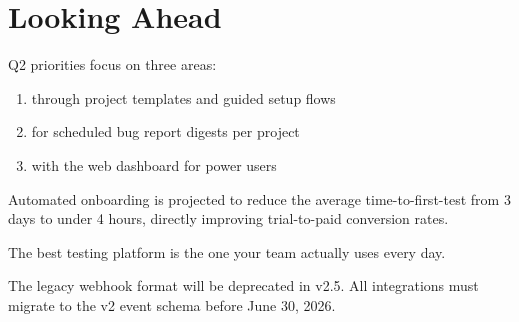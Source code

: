 \documentclass[11pt]{article}
\begin{document}
\section{Looking Ahead}

Q2 priorities focus on three areas:

\begin{enumerate}
    \item {} through project templates and guided setup flows
    \item {} for scheduled bug report digests per project
    \item {} with the web dashboard for power users
\end{enumerate}

\begin{businessvalue}
Automated onboarding is projected to reduce the average time-to-first-test from 3 days to under 4 hours, directly improving trial-to-paid conversion rates.
\end{businessvalue}

\begin{pullquote}
The best testing platform is the one your team actually uses every day.
\end{pullquote}

\begin{warningbox}
The legacy webhook format will be deprecated in v2.5. All integrations must migrate to the v2 event schema before June 30, 2026.
\end{warningbox}
\end{document}
